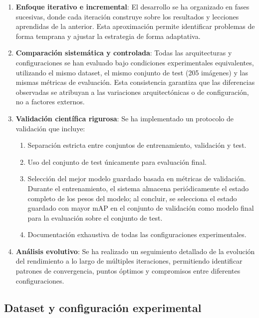 \begin{enumerate}
    \item \textbf{Enfoque iterativo e incremental}: El desarrollo se ha organizado en fases sucesivas, donde cada iteración construye sobre los resultados y lecciones aprendidas de la anterior. Esta aproximación permite identificar problemas de forma temprana y ajustar la estrategia de forma adaptativa.
    
    \item \textbf{Comparación sistemática y controlada}: Todas las arquitecturas y configuraciones se han evaluado bajo condiciones experimentales equivalentes, utilizando el mismo dataset, el mismo conjunto de test (205 imágenes) y las mismas métricas de evaluación. Esta consistencia garantiza que las diferencias observadas se atribuyan a las variaciones arquitectónicas o de configuración, no a factores externos.
    
    \item \textbf{Validación científica rigurosa}: Se ha implementado un protocolo de validación que incluye:
    \begin{enumerate}
        \item Separación estricta entre conjuntos de entrenamiento, validación y test.
        \item Uso del conjunto de test únicamente para evaluación final.
        \item Selección del mejor modelo guardado basada en métricas de validación. Durante el entrenamiento, el sistema almacena periódicamente el estado completo de los pesos del modelo; al concluir, se selecciona el estado guardado con mayor mAP en el conjunto de validación como modelo final para la evaluación sobre el conjunto de test.
        \item Documentación exhaustiva de todas las configuraciones experimentales.
    \end{enumerate}
    
    \item \textbf{Análisis evolutivo}: Se ha realizado un seguimiento detallado de la evolución del rendimiento a lo largo de múltiples iteraciones, permitiendo identificar patrones de convergencia, puntos óptimos y compromisos entre diferentes configuraciones.
\end{enumerate}

\subsection{Dataset y configuración experimental}


